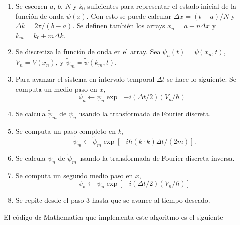 \documentclass[letterpaper,11pt]{article}
\begin{document}
\begin{enumerate}
\item Se escogen $a$, $b$, $N$ y $k_0$ suficientes para representar el estado inicial de la función de onda $\psi(x)$. Con esto se puede calcular $\Delta x = (b - a) / N$ y $\Delta k = 2\pi / (b - a)$.  Se definen también los arrays
   $x_n = a + n \Delta x$ y $k_m = k_0 + m \Delta k$.
   
\item Se discretiza la función de onda en el array. Sea $\psi_n(t) = \psi(x_n, t)$, $V_n = V(x_n)$, y $\widetilde{\psi}_m = \widetilde{\psi}(k_m, t)$.

\item Para avanzar el sistema en intervalo temporal $\Delta t$ se hace lo siguiente.
Se computa un medio paso en $x$,
\[
\psi_n \longleftarrow \psi_n
       \exp[-i (\Delta t / 2) (V_n / \hbar)]
\]

\item Se calcula $\widetilde{\psi}_m$ de $\psi_n$ usando la transformada de Fourier discreta.

\item Se computa un paso completo en $k$,
\[
	\widetilde{\psi}_m \longleftarrow \widetilde{\psi}_m
      \exp[-i \hbar (k \cdot k) \Delta t / (2 m)].
\]

\item Se calcula $\psi_n$ de $\widetilde{\psi}_m$ usando la transformada de Fourier discreta inversa.

\item Se computa un segundo medio paso en $x$,
\[
\psi_n \longleftarrow \psi_n
       \exp[-i (\Delta t / 2) (V_n / \hbar)]
\]

\item Se repite desde el paso 3 hasta que se avance al tiempo deseado.

\end{enumerate}

El código de Mathematica que implementa este algoritmo es el siguiente

\end{document}

